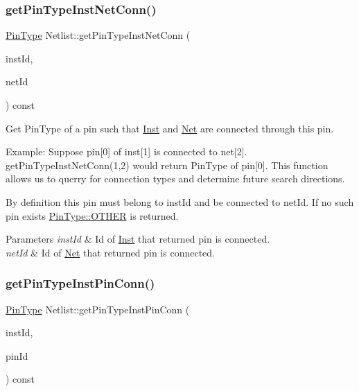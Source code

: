 \subsubsection{\texorpdfstring{get\+Pin\+Type\+Inst\+Net\+Conn()}{getPinTypeInstNetConn()}}
{\footnotesize\ttfamily \hyperlink{type_8h_afaab50027002ecbb6c8ac27e727d1bb4}{Pin\+Type} Netlist\+::get\+Pin\+Type\+Inst\+Net\+Conn (\begin{DoxyParamCaption}\item[{\hyperlink{type_8h_a581e8093e28e7362f2b6937296190676}{Index\+Type}}]{inst\+Id,  }\item[{\hyperlink{type_8h_a581e8093e28e7362f2b6937296190676}{Index\+Type}}]{net\+Id }\end{DoxyParamCaption}) const}



Get Pin\+Type of a pin such that \hyperlink{classInst}{Inst} and \hyperlink{classNet}{Net} are connected through this pin. 

Example\+: Suppose pin\mbox{[}0\mbox{]} of inst\mbox{[}1\mbox{]} is connected to net\mbox{[}2\mbox{]}. get\+Pin\+Type\+Inst\+Net\+Conn(1,2) would return Pin\+Type of pin\mbox{[}0\mbox{]}. This function allows us to querry for connection types and determine future search directions.

By definition this pin must belong to inst\+Id and be connected to net\+Id. If no such pin exists \hyperlink{type_8h_afaab50027002ecbb6c8ac27e727d1bb4a03570470bad94692ce93e32700d2e1cb}{Pin\+Type\+::\+O\+T\+H\+ER} is returned.


\begin{DoxyParams}{Parameters}
{\em inst\+Id} & Id of \hyperlink{classInst}{Inst} that returned pin is connected. \\
\hline
{\em net\+Id} & Id of \hyperlink{classNet}{Net} that returned pin is connected. \\
\hline
\end{DoxyParams}
\mbox{\label{classNetlist_a27d477f7bd6fffd915015dbd3b3a0649}} 
\subsubsection{\texorpdfstring{get\+Pin\+Type\+Inst\+Pin\+Conn()}{getPinTypeInstPinConn()}}
{\footnotesize\ttfamily \hyperlink{type_8h_afaab50027002ecbb6c8ac27e727d1bb4}{Pin\+Type} Netlist\+::get\+Pin\+Type\+Inst\+Pin\+Conn (\begin{DoxyParamCaption}\item[{\hyperlink{type_8h_a581e8093e28e7362f2b6937296190676}{Index\+Type}}]{inst\+Id,  }\item[{\hyperlink{type_8h_a581e8093e28e7362f2b6937296190676}{Index\+Type}}]{pin\+Id }\end{DoxyParamCaption}) const}



